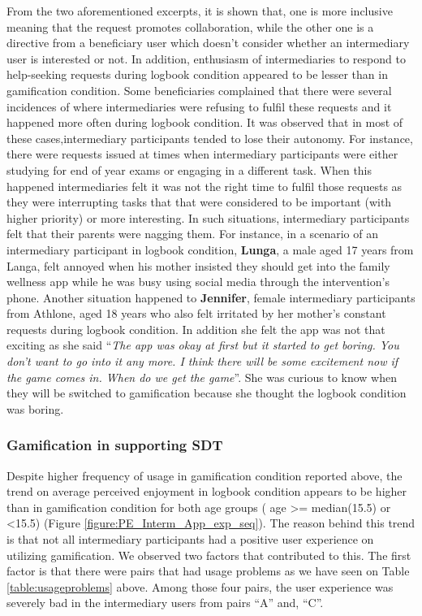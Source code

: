 \documentclass{sig-alternate}
\begin{document}
From the two aforementioned excerpts, it is shown that, one is more inclusive meaning that the request promotes collaboration, while the other one is a directive from a beneficiary user which doesn't consider whether an intermediary user is interested or not. In addition, enthusiasm of intermediaries to respond to help-seeking requests during logbook condition appeared to be lesser than in gamification condition. Some beneficiaries complained that there were several incidences of where intermediaries were refusing to fulfil these requests and it happened more often during logbook condition. It was observed that in most of these cases,intermediary participants tended to lose their autonomy. For instance, there were requests issued at times when intermediary participants were either studying for end of year exams or engaging in a different task. When this happened intermediaries felt it was not the right time to fulfil those requests as they were interrupting tasks that that were considered to be important (with higher priority) or more interesting. In such situations, intermediary participants felt that their parents were nagging them. For instance, in a scenario of an intermediary participant in logbook condition, \textbf{Lunga}, a male aged 17 years from Langa, felt annoyed when his mother insisted they should get into the family wellness app while he was busy using social media through the intervention's phone. Another situation happened to \textbf{Jennifer}, female intermediary participants from Athlone, aged 18 years who also felt irritated by her mother's constant requests during logbook condition. In addition she felt the app was not that exciting as she said ``\emph{The app was okay at first but it started to get boring. You don't want to go into it any more. I think there will be some excitement now if the game comes in. When do we get the game}''. She was curious to know when they will be switched to gamification because she thought the logbook condition was boring.
\subsubsection{{Gamification in supporting SDT}}  
Despite higher frequency of usage in gamification condition reported above, the trend on average perceived enjoyment in logbook condition appears to be higher than in gamification condition for both age groups ( age \textgreater = median(15.5) or \textless 15.5) (Figure \ref{figure:PE_Interm_App_exp_seq}). The reason behind this trend is that not all intermediary participants had a positive user experience on utilizing gamification. We observed two factors that contributed  to this. The first factor is that there were pairs that had usage problems as we have seen on Table \ref{table:usageproblems} above. Among those four pairs, the user experience was severely bad in the intermediary users from pairs ``A'' and, ``C''.
\end{document}
